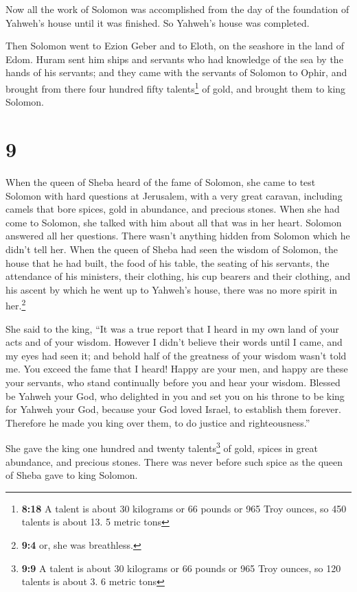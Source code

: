  Now all the work of Solomon was accomplished from the
day of the foundation of Yahweh's house until it was finished. So
Yahweh's house was completed.

 Then Solomon went to Ezion Geber and to Eloth, on the
seashore in the land of Edom.  Huram sent him ships and
servants who had knowledge of the sea by the hands of his servants; and
they came with the servants of Solomon to Ophir, and brought from there
four hundred fifty talents\footnote{\textbf{8:18} A talent is about 30
  kilograms or 66 pounds or 965 Troy ounces, so 450 talents is about 13.
  5 metric tons} of gold, and brought them to king Solomon.

\hypertarget{section-8}{%
\section{9}\label{section-8}}

 When the queen of Sheba heard of the fame of Solomon, she
came to test Solomon with hard questions at Jerusalem, with a very great
caravan, including camels that bore spices, gold in abundance, and
precious stones. When she had come to Solomon, she talked with him about
all that was in her heart.  Solomon answered all her
questions. There wasn't anything hidden from Solomon which he didn't
tell her.  When the queen of Sheba had seen the wisdom of
Solomon, the house that he had built,  the food of his
table, the seating of his servants, the attendance of his ministers,
their clothing, his cup bearers and their clothing, and his ascent by
which he went up to Yahweh's house, there was no more spirit in
her.\footnote{\textbf{9:4} or, she was breathless.}

 She said to the king, ``It was a true report that I heard
in my own land of your acts and of your wisdom.  However I
didn't believe their words until I came, and my eyes had seen it; and
behold half of the greatness of your wisdom wasn't told me. You exceed
the fame that I heard!  Happy are your men, and happy are
these your servants, who stand continually before you and hear your
wisdom.  Blessed be Yahweh your God, who delighted in you
and set you on his throne to be king for Yahweh your God, because your
God loved Israel, to establish them forever. Therefore he made you king
over them, to do justice and righteousness.''

 She gave the king one hundred and twenty
talents\footnote{\textbf{9:9} A talent is about 30 kilograms or 66
  pounds or 965 Troy ounces, so 120 talents is about 3. 6 metric tons}
of gold, spices in great abundance, and precious stones. There was never
before such spice as the queen of Sheba gave to king Solomon.

